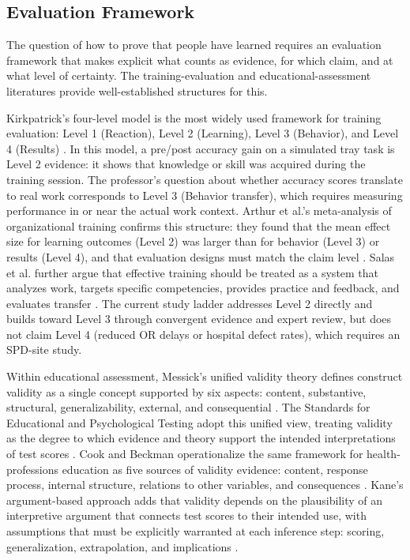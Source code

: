 \documentclass[10pt,a4paper]{article}
\begin{document}
\subsection{Evaluation Framework}

The question of how to prove that people have learned requires an evaluation
framework that makes explicit what counts as evidence, for which claim, and at
what level of certainty. The training-evaluation and educational-assessment
literatures provide well-established structures for this.

Kirkpatrick's four-level model is the most widely used framework for training
evaluation: Level 1 (Reaction), Level 2 (Learning), Level 3 (Behavior), and
Level 4 (Results) \cite{kirkpatrick-evaluation-1994}. In this model, a pre/post
accuracy gain on a simulated tray task is Level 2 evidence: it shows that
knowledge or skill was acquired during the training session. The professor's
question about whether accuracy scores translate to real work corresponds to
Level 3 (Behavior transfer), which requires measuring performance in or near the
actual work context. Arthur et al.'s meta-analysis of organizational training
confirms this structure: they found that the mean effect size for learning
outcomes (Level 2) was larger than for behavior (Level 3) or results (Level 4),
and that evaluation designs must match the claim level
\cite{arthur-et-al-2003}. Salas et al. further argue that effective training
should be treated as a system that analyzes work, targets specific
competencies, provides practice and feedback, and evaluates transfer
\cite{salas-et-al-2012}. The current study ladder addresses Level 2 directly
and builds toward Level 3 through convergent evidence and expert review, but
does not claim Level 4 (reduced OR delays or hospital defect rates), which
requires an SPD-site study.

Within educational assessment, Messick's unified validity theory defines
construct validity as a single concept supported by six aspects: content,
substantive, structural, generalizability, external, and consequential
\cite{messick-validity-1989}. The Standards for Educational and Psychological
Testing adopt this unified view, treating validity as the degree to which
evidence and theory support the intended interpretations of test scores
\cite{aera-standards-2014}. Cook and Beckman operationalize the same framework
for health-professions education as five sources of validity evidence: content,
response process, internal structure, relations to other variables, and
consequences \cite{cook-beckman-validity-2006}. Kane's argument-based approach
adds that validity depends on the plausibility of an interpretive argument that
connects test scores to their intended use, with assumptions that must be
explicitly warranted at each inference step: scoring, generalization,
extrapolation, and implications \cite{kane-validity-2013}.
\end{document}
